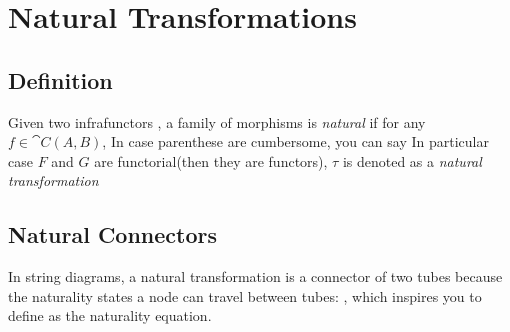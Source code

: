 \section{Natural Transformations}

\subsection{Definition}

Given two infrafunctors
, a family of morphisms
is \textit{natural} if for any $f \in \cat{C}(A,B)$,
In case parenthese are cumbersome, you can say
In particular case $F$ and $G$ are functorial(then they are functors), $\tau$ is denoted as a \textit{natural transformation}

\subsection{Natural Connectors}

In string diagrams, a natural transformation is a connector of two tubes
because the naturality states a node can travel between tubes:
, which inspires you to define
as the naturality equation.



